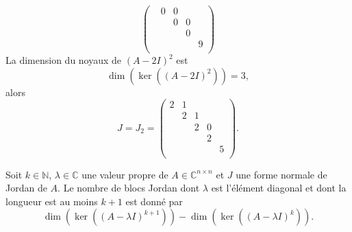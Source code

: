 \begin{example}
\begin{displaymath}
\begin{pmatrix}
    & 0 & 0 \\
    & & 0 & 0 \\
    & & & 0   \\
    & & & & 9 \\
  \end{pmatrix}
\end{displaymath}
La dimension du noyaux  de $(A - 2I)^2$  est
\begin{displaymath}
\dim(  \ker((A - 2I)^2) ) = 3,
\end{displaymath}
alors
\begin{displaymath}
  J = J_2 =  \begin{pmatrix}
    2 & 1  \\
    & 2 & 1 \\
    & & 2 & 0 \\
    & & & 2   \\
    & & & & 5 \\
  \end{pmatrix}. 
\end{displaymath}
\end{example}


\begin{lemma}
  \label{lem:30}
  Soit $k ∈ ℕ$, $λ∈ ℂ$ une valeur propre de $A ∈ℂ^{n×n}$ et $J$ une forme normale de Jordan de $A$.   Le nombre de blocs Jordan dont $λ$ est l'élément diagonal et dont la longueur est au moins $k+1$   est donné par
  \begin{displaymath}
    \dim(\ker\left((A - λI)^{k+1}\right)) -\dim(\ker\left((A - λI)^{k}\right)). 
  \end{displaymath}
\end{lemma}

